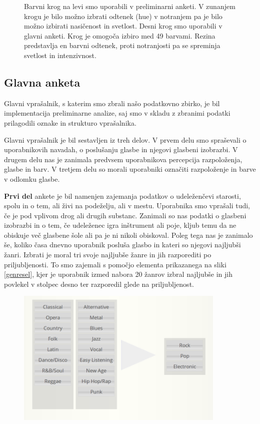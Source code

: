 \documentclass[a4paper, 12pt]{book}
\begin{document}
{\begin{figure}[ht]
\caption{Barvni krog na levi smo uporabili v preliminarni anketi. V zunanjem krogu je bilo možno izbrati odtenek (hue) v notranjem pa je bilo možno izbirati nasičenost in svetlost. Desni krog smo uporabili v glavni anketi. Krog je omogoča izbiro med 49 barvami. Rezina predstavlja en barvni odtenek, proti notranjosti pa se spreminja svetlost in intenzivnost. }
\label{colorwheels}
\end{figure}

\subsection{Glavna anketa}
\label{glavnaanketa}

Glavni vprašalnik, s katerim smo zbrali našo podatkovno zbirko, je bil implementacija preliminarne analize, saj smo v skladu z zbranimi podatki prilagodili oznake in strukturo vprašalnika.

Glavni vprašalnik je bil sestavljen iz treh delov. V prvem delu smo spraševali o uporabnikovih navadah, o poslušanju glasbe in njegovi glasbeni izobrazbi. V drugem delu nas je zanimala predvsem uporabnikova percepcija razpoloženja, glasbe in barv. V tretjem delu so morali uporabniki označiti razpoloženje in barve v odlomku glasbe. 

\textbf{Prvi del} ankete je bil namenjen zajemanja podatkov o  udeleženčevi starosti, spolu in o tem, ali živi na podeželju, ali v mestu.  Uporabnika smo vprašali tudi, če je pod vplivom drog ali drugih substanc. Zanimali so nas podatki o glasbeni izobrazbi in o tem, če udeleženec igra inštrument ali poje, kljub temu da ne obiskuje več glasbene šole ali pa je ni nikoli obiskoval. Poleg tega nas je zanimalo še, koliko časa dnevno uporabnik posluša glasbo in kateri so njegovi najljubši žanri. Izbrati je moral tri svoje najljubše žanre in jih razporediti po priljubljenosti. To smo zajemali s pomočjo elementa prikazanega na sliki \ref{genresel}, kjer je uporabnik izmed nabora 20 žanrov izbral najljubše in jih povlekel v stolpec desno ter razporedil glede na priljubljenost. 

\begin{figure}[h!t]
\centering
\includegraphics[width=10cm]{genresel.png}


\end{figure}}
\end{document}

